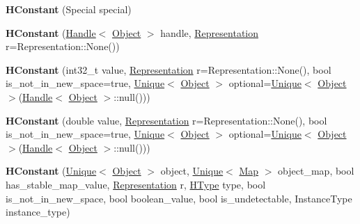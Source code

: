 \begin{DoxyCompactItemize}
\item 
{\bfseries H\+Constant} (Special special)\hypertarget{classv8_1_1internal_1_1_h_constant_aac7c7853aa184ca4f9c14c990b0c4be6}{}\label{classv8_1_1internal_1_1_h_constant_aac7c7853aa184ca4f9c14c990b0c4be6}

\item 
{\bfseries H\+Constant} (\hyperlink{classv8_1_1internal_1_1_handle}{Handle}$<$ \hyperlink{classv8_1_1internal_1_1_object}{Object} $>$ handle, \hyperlink{classv8_1_1internal_1_1_representation}{Representation} r=Representation\+::\+None())\hypertarget{classv8_1_1internal_1_1_h_constant_abb2a6ee26274dfd700cc51a8814634d6}{}\label{classv8_1_1internal_1_1_h_constant_abb2a6ee26274dfd700cc51a8814634d6}

\item 
{\bfseries H\+Constant} (int32\+\_\+t value, \hyperlink{classv8_1_1internal_1_1_representation}{Representation} r=Representation\+::\+None(), bool is\+\_\+not\+\_\+in\+\_\+new\+\_\+space=true, \hyperlink{classv8_1_1internal_1_1_unique}{Unique}$<$ \hyperlink{classv8_1_1internal_1_1_object}{Object} $>$ optional=\hyperlink{classv8_1_1internal_1_1_unique}{Unique}$<$ \hyperlink{classv8_1_1internal_1_1_object}{Object} $>$(\hyperlink{classv8_1_1internal_1_1_handle}{Handle}$<$ \hyperlink{classv8_1_1internal_1_1_object}{Object} $>$\+::null()))\hypertarget{classv8_1_1internal_1_1_h_constant_a390dd7cee6da35e48abc91bf46ebbd27}{}\label{classv8_1_1internal_1_1_h_constant_a390dd7cee6da35e48abc91bf46ebbd27}

\item 
{\bfseries H\+Constant} (double value, \hyperlink{classv8_1_1internal_1_1_representation}{Representation} r=Representation\+::\+None(), bool is\+\_\+not\+\_\+in\+\_\+new\+\_\+space=true, \hyperlink{classv8_1_1internal_1_1_unique}{Unique}$<$ \hyperlink{classv8_1_1internal_1_1_object}{Object} $>$ optional=\hyperlink{classv8_1_1internal_1_1_unique}{Unique}$<$ \hyperlink{classv8_1_1internal_1_1_object}{Object} $>$(\hyperlink{classv8_1_1internal_1_1_handle}{Handle}$<$ \hyperlink{classv8_1_1internal_1_1_object}{Object} $>$\+::null()))\hypertarget{classv8_1_1internal_1_1_h_constant_a8f9c87013902c54bb7c0a8c2a47734a0}{}\label{classv8_1_1internal_1_1_h_constant_a8f9c87013902c54bb7c0a8c2a47734a0}

\item 
{\bfseries H\+Constant} (\hyperlink{classv8_1_1internal_1_1_unique}{Unique}$<$ \hyperlink{classv8_1_1internal_1_1_object}{Object} $>$ object, \hyperlink{classv8_1_1internal_1_1_unique}{Unique}$<$ \hyperlink{classv8_1_1internal_1_1_map}{Map} $>$ object\+\_\+map, bool has\+\_\+stable\+\_\+map\+\_\+value, \hyperlink{classv8_1_1internal_1_1_representation}{Representation} r, \hyperlink{classv8_1_1internal_1_1_h_type}{H\+Type} type, bool is\+\_\+not\+\_\+in\+\_\+new\+\_\+space, bool boolean\+\_\+value, bool is\+\_\+undetectable, Instance\+Type instance\+\_\+type)\hypertarget{classv8_1_1internal_1_1_h_constant_a5ff94db119e86c5b8ca18bbbbe3608c9}{}\label{classv8_1_1internal_1_1_h_constant_a5ff94db119e86c5b8ca18bbbbe3608c9}


\end{DoxyCompactItemize}
